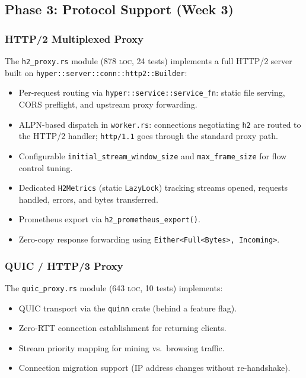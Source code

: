 \documentclass[a4paper, 11pt]{article}
\newcommand{\loc}{\textsc{loc}}
\begin{document}
\subsection{Phase 3: Protocol Support (Week 3)}

\subsubsection{HTTP/2 Multiplexed Proxy}

The \texttt{h2\_proxy.rs} module (878 \loc{}, 24 tests) implements a
full HTTP/2 server built on \texttt{hyper::server::conn::http2::Builder}:

\begin{itemize}[nosep]
  \item Per-request routing via \texttt{hyper::service::service\_fn}:
        static file serving, CORS preflight, and upstream proxy forwarding.
  \item ALPN-based dispatch in \texttt{worker.rs}: connections negotiating
        \texttt{h2} are routed to the HTTP/2 handler; \texttt{http/1.1}
        goes through the standard proxy path.
  \item Configurable \texttt{initial\_stream\_window\_size} and
        \texttt{max\_frame\_size} for flow control tuning.
  \item Dedicated \texttt{H2Metrics} (static \texttt{LazyLock}) tracking
        streams opened, requests handled, errors, and bytes transferred.
  \item Prometheus export via \texttt{h2\_prometheus\_export()}.
  \item Zero-copy response forwarding using \texttt{Either<Full<Bytes>, Incoming>}.
\end{itemize}

\subsubsection{QUIC / HTTP/3 Proxy}

The \texttt{quic\_proxy.rs} module (643 \loc{}, 10 tests) implements:

\begin{itemize}[nosep]
  \item QUIC transport via the \texttt{quinn} crate (behind a feature flag).
  \item Zero-RTT connection establishment for returning clients.
  \item Stream priority mapping for mining vs.\ browsing traffic.
  \item Connection migration support (IP address changes without
        re-handshake).
\end{itemize}
\end{document}
